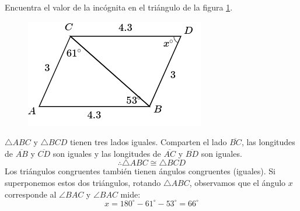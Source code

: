 Encuentra el valor de la incógnita en el triángulo de la figura \ref{fig:angle_triangle_20}.

\begin{minipage}[t][5cm][b]{0.3\textwidth}
    \begin{figure}[H]
        \centering
        \includegraphics[width=0.99\linewidth]{../images/angle_triangle_20.png}
        \caption{}
        \label{fig:angle_triangle_20}
    \end{figure}
\end{minipage}\hfill
\begin{minipage}[t]{0.65\textwidth}
    \begin{solutionbox}{5cm}
        $\triangle ABC$ y $\triangle BCD$ tienen tres lados iguales. Comparten el lado
        $\overline{BC}$, las longitudes de $\overline{AB}$ y $\overline{CD}$ son iguales y las longitudes de
        $\overline{AC}$ y $\overline{BD}$ son iguales.
        \[\therefore \triangle ABC \cong \triangle BCD\]
        Los triángulos congruentes también tienen ángulos congruentes (iguales). Si superponemos estos dos triángulos, rotando
        $\triangle ABC$, observamos que el ángulo $x$ corresponde al
        $\angle BAC$ y $\angle BAC$ mide: \[x=180^\circ-61^\circ-53^\circ=66^\circ\]
    \end{solutionbox}
\end{minipage}
